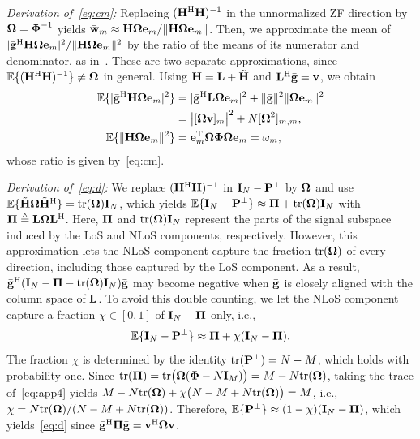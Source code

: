 \documentclass[journal]{IEEEtran}
\newcommand{\rev}[1]{{\color{red}#1}}
\newcommand{\rev}[1]{#1}
\begin{document}
\textit{Derivation of~\eqref{eq:cm}:} Replacing $(\bH^{\mathrm H}\bH)^{-1}$ in the unnormalized ZF direction by $\bOm=\bPhi^{-1}$ yields $\wb_m\approx\bH\bOm\be_m/\|\bH\bOm\be_m\|$. Then, we approximate the mean of $|\gb^{\mathrm H}\bH\bOm\be_m|^2/\|\bH\bOm\be_m\|^2$ by the ratio of the means of its numerator and denominator, as in~\cite[Lemma~1]{ZhangJSTSP2014}. These are two separate approximations, since $\E\{(\bH^{\mathrm H}\bH)^{-1}\}\neq\bOm$ in general. Using $\bH=\bL+\Htl$ and $\bL^{\mathrm H}\gb=\bv$, we obtain
\begin{align}
\E\{|\gb^{\mathrm H}\bH\bOm\be_m|^2\}&=|\gb^{\mathrm H}\bL\bOm\be_m|^2+\|\gb\|^2\|\bOm\be_m\|^2\nonumber\\
&=\big|[\bOm\bv]_m\big|^2+N[\bOm^2]_{m,m},\label{eq:app1}\\
\E\{\|\bH\bOm\be_m\|^2\}&=\be_m^{\mathrm T}\bOm\bPhi\bOm\be_m=\omega_m,\label{eq:app2}
\end{align}
whose ratio is given by~\eqref{eq:cm}.

\textit{Derivation of~\eqref{eq:d}:} We replace $(\bH^{\mathrm H}\bH)^{-1}$ in $\bI_N-\PHp$ by $\bOm$ and use $\E\{\Htl\bOm\Htl^{\mathrm H}\}=\tr(\bOm)\bI_N$, which yields $\E\{\bI_N-\PHp\}\approx\bPi+\tr(\bOm)\bI_N$ with $\bPi\triangleq\bL\bOm\bL^{\mathrm H}$. Here, $\bPi$ and $\tr(\bOm)\bI_N$ represent the parts of the signal subspace induced by the LoS and NLoS components, respectively. However, this approximation lets the NLoS component capture the fraction $\tr(\bOm)$ of every direction, including those captured by the LoS component. As a result, $\gb^{\mathrm H}(\bI_N-\bPi-\tr(\bOm)\bI_N)\gb$ may become negative when $\gb$ is closely aligned with the column space of $\bL$. To avoid this double counting, we let the NLoS component capture a fraction $\chi\in[0,1]$ of \rev{$\bI_N-\bPi$} only, i.e.,
\begin{equation}\label{eq:app4}
\E\{\bI_N-\PHp\}\approx\bPi+\chi(\bI_N-\bPi).
\end{equation}
The fraction $\chi$ is determined by the identity $\tr(\PHp)=N-M$, which holds with probability one. Since $\tr(\bPi)=\tr\big(\bOm(\bPhi-N\bI_M)\big)=M-N\tr(\bOm)$, taking the trace of~\eqref{eq:app4} yields $M-N\tr(\bOm)+\chi\big(N-M+N\tr(\bOm)\big)=M$, i.e., $\chi=N\tr(\bOm)/(N-M+N\tr(\bOm))$. Therefore, $\E\{\PHp\}\approx(1-\chi)(\bI_N-\bPi)$, which yields~\eqref{eq:d} since $\gb^{\mathrm H}\bPi\gb=\bv^{\mathrm H}\bOm\bv$.
\end{document}
